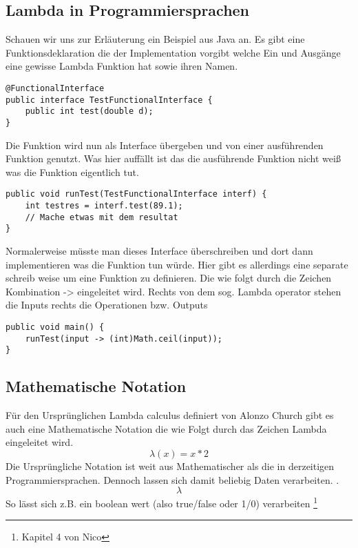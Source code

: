 \subsection{Lambda in Programmiersprachen}
Schauen wir uns zur Erläuterung ein Beispiel aus Java an.
Es gibt eine Funktionsdeklaration die der Implementation vorgibt welche Ein und Ausgänge
eine gewisse Lambda Funktion hat sowie ihren Namen.
\begin{verbatim}
@FunctionalInterface
public interface TestFunctionalInterface {
	public int test(double d);
}
\end{verbatim}
Die Funktion wird nun als Interface übergeben und von einer ausführenden Funktion genutzt.
Was hier auffällt ist das die ausführende Funktion nicht weiß was die Funktion eigentlich tut.
\begin{verbatim}
public void runTest(TestFunctionalInterface interf) {
	int testres = interf.test(89.1);
	// Mache etwas mit dem resultat
}
\end{verbatim}
Normalerweise müsste man dieses Interface überschreiben und dort dann implementieren was die Funktion tun würde. Hier gibt es allerdings eine separate schreib weise um eine Funktion zu definieren. Die wie folgt durch die Zeichen Kombination -> eingeleitet wird.
Rechts von dem sog. Lambda operator stehen die Inputs rechts die Operationen bzw. Outputs 
\begin{verbatim}
public void main() {
	runTest(input -> (int)Math.ceil(input));
}
\end{verbatim}

\subsection{Mathematische Notation}
Für den Ursprünglichen Lambda calculus definiert von Alonzo Church gibt es auch eine Mathematische Notation die wie Folgt durch das Zeichen Lambda eingeleitet wird.
\begin{equation}
\lambda(x) = x * 2
\end{equation}
Die Ursprüngliche Notation ist weit aus Mathematischer als die in derzeitigen Programmiersprachen. Dennoch lassen sich damit beliebig Daten verarbeiten. .\cite{lambdacalculus}
\begin{equation}
\lambda
\end{equation}
So lässt sich z.B. ein boolean wert (also true/false oder 1/0) verarbeiten 
\footnote{Kapitel 4 von Nico}
